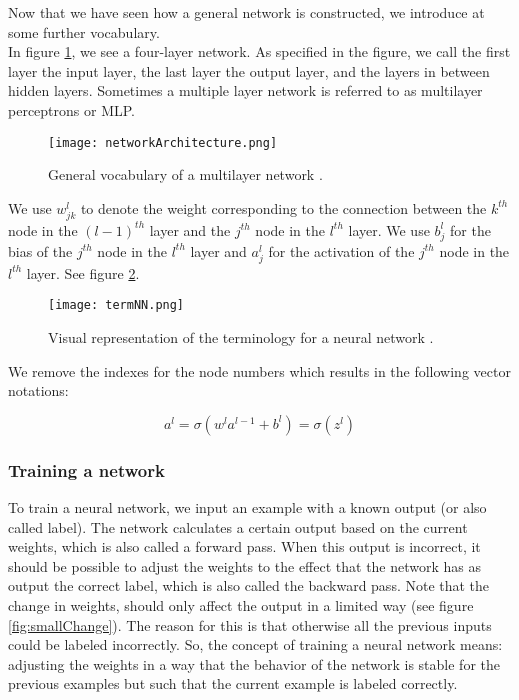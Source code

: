 Now that we have seen how a general network is constructed, we introduce at some further vocabulary. \\
In figure \ref{fig:networkArch}, we see a four-layer network. As specified in the figure, we call the first layer the input layer, the last layer the output layer, and the layers in between hidden layers. Sometimes a multiple layer network is referred to as multilayer perceptrons or MLP. 

\begin{figure}[!htb]
	\centering
	\texttt{[image: networkArchitecture.png]}
	\caption{General vocabulary of a multilayer network \cite{NNintro:online}.}
	\label{fig:networkArch}
\end{figure} 	

We use $w^l_{jk}$ to denote the weight corresponding to the connection between the $k^{th}$ node in the $(l-1)^{th}$ layer and the $j^{th}$ node in the $l^{th}$ layer. We use $b^l_j$ for the bias of the $j^{th}$ node in the $l^{th}$ layer and $a^l_j$ for the activation of the $j^{th}$ node in the $l^{th}$ layer. See figure \ref{fig:termNN}. \\

\begin{figure}[!htb]
	\centering
	\texttt{[image: termNN.png]}
	\caption{Visual representation of the terminology for a neural network \cite{NNintro:online}.}
	\label{fig:termNN}
\end{figure} 

\noindent We remove the indexes for the node numbers which results in the following vector notations:

\begin{equation} 
a^l = \sigma (w^la^{l-1}+b^l) = \sigma (z^l)
\end{equation}	


		\subsubsection{Training a network}
		
To train a neural network, we input an example with a known output (or also called label). The network calculates a certain output based on the current weights, which is also called a forward pass. When this output is incorrect, it should be possible to adjust the weights to the effect that the network has as output the correct label, which is also called the backward pass. Note that the change in weights, should only affect the output in a limited way (see figure \ref{fig:smallChange}). The reason for this is that otherwise all the previous inputs could be labeled incorrectly. So, the concept of training a neural network means: adjusting the weights in a way that the behavior of the network is stable for the previous examples but such that the current example is labeled correctly. \\

